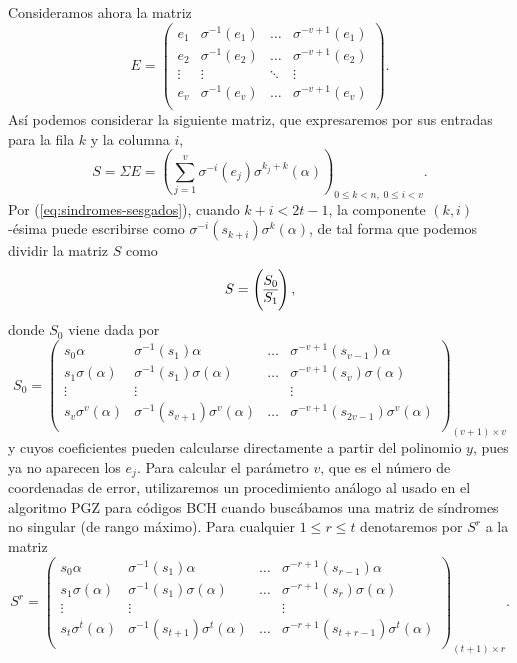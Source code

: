 Consideramos ahora la matriz 
\[
  E = \begin{pmatrix}
    e_1 & \sigma^{-1}(e_1) & \dots & \sigma^{-v + 1}(e_1)\\
    e_2 & \sigma^{-1}(e_2) & \dots & \sigma^{-v + 1}(e_2)\\
    \vdots & \vdots & \ddots & \vdots \\
    e_v & \sigma^{-1}(e_v) & \dots & \sigma^{-v + 1}(e_v)\\
  \end{pmatrix}.
\]
Así podemos considerar la siguiente matriz, que expresaremos por sus entradas para la fila \(k\) y la columna \(i\),
\[
  S = \Sigma E = \left(\sum_{j=1}^v \sigma^{-i}(e_j)\sigma^{k_j+k}(\alpha)\right)_{0 \leq k < n,\; 0 \leq i < v}.
\]
Por (\ref{eq:sindromes-sesgados}), cuando \(k + i < 2t - 1\), la componente \((k, i)\)-ésima puede escribirse como \(\sigma^{-i}(s_{k+i})\sigma^{k}(\alpha)\), de tal forma que podemos dividir la matriz \(S\) como
\[
  S = \left( \begin{array}{@{}c@{}}
    S_0\\\hline
    S_1
  \end{array}\right),
\]
donde \(S_0\) viene dada por
\[
  S_0 = \begin{pmatrix}
    s_0\alpha & \sigma^{-1}(s_1)\alpha & \dots & \sigma^{-v+1}(s_{v-1})\alpha\\
    s_1\sigma(\alpha) & \sigma^{-1}(s_1)\sigma(\alpha) & \dots & \sigma^{-v+1}(s_{v})\sigma(\alpha)\\
    \vdots & \vdots & & \vdots \\
    s_v\sigma^v(\alpha) & \sigma^{-1}(s_{v+1})\sigma^v(\alpha) & \dots & \sigma^{-v+1}(s_{2v-1})\sigma^v(\alpha)\\
  \end{pmatrix}_{(v + 1) \times v}
\]
y cuyos coeficientes pueden calcularse directamente a partir del polinomio \(y\), pues ya no aparecen los \(e_j\).
Para calcular el parámetro \(v\), que es el número de coordenadas de error, utilizaremos un procedimiento análogo al usado en el algoritmo PGZ para códigos BCH cuando buscábamos una matriz de síndromes no singular (de rango máximo).
Para cualquier \(1 \leq r \leq t\) denotaremos por \(S^r\) a la matriz
\[
  S^r = \begin{pmatrix}
    s_0\alpha & \sigma^{-1}(s_1)\alpha & \dots & \sigma^{-r+1}(s_{r-1})\alpha\\
    s_1\sigma(\alpha) & \sigma^{-1}(s_1)\sigma(\alpha) & \dots & \sigma^{-r+1}(s_{r})\sigma(\alpha)\\
    \vdots & \vdots & & \vdots \\
    s_t\sigma^t(\alpha) & \sigma^{-1}(s_{t+1})\sigma^t(\alpha) & \dots & \sigma^{-r+1}(s_{t+r-1})\sigma^t(\alpha)\\
  \end{pmatrix}_{(t + 1) \times r}.
\]
